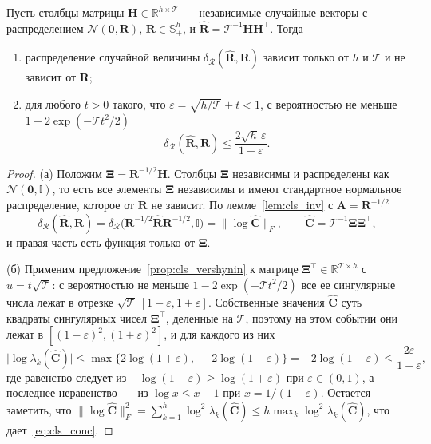 \begin{theorem}\label{thm:cls_conc}
Пусть столбцы матрицы $\mathbf{H} \in \mathbb{R}^{h \times \mathcal{T}}$~--- независимые случайные векторы с распределением $\mathcal{N}(\mathbf{0}, \mathbf{R})$, $\mathbf{R} \in \mathbb{S}_{+}^{h}$, и $\hat{\mathbf{R}} = \mathcal{T}^{-1} \mathbf{H}\mathbf{H}^{\top}$. Тогда
\begin{enumerate}
    \item[(а)] распределение случайной величины $\delta_{\mathcal{R}}(\hat{\mathbf{R}}, \mathbf{R})$ зависит только от $h$ и $\mathcal{T}$ и не зависит от $\mathbf{R}$;
    \item[(б)] для любого $t > 0$ такого, что $\varepsilon = \sqrt{h/\mathcal{T}} + t < 1$, с вероятностью не меньше $1 - 2\exp(-\mathcal{T}t^2/2)$
    \begin{equation}\label{eq:cls_conc}
    \delta_{\mathcal{R}}(\hat{\mathbf{R}}, \mathbf{R}) \leqslant \frac{2\sqrt{h}\, \varepsilon}{1 - \varepsilon} .
    \end{equation}
\end{enumerate}
\end{theorem}
\begin{proof}
(а) Положим $\boldsymbol{\Xi} = \mathbf{R}^{-1/2}\mathbf{H}$. Столбцы $\boldsymbol{\Xi}$ независимы и распределены как $\mathcal{N}(\mathbf{0}, \mathbb{I})$, то есть все элементы $\boldsymbol{\Xi}$ независимы и имеют стандартное нормальное распределение, которое от $\mathbf{R}$ не зависит. По лемме~\ref{lem:cls_inv} с $\mathbf{A} = \mathbf{R}^{-1/2}$
\begin{equation*}
\delta_{\mathcal{R}}(\hat{\mathbf{R}}, \mathbf{R}) = \delta_{\mathcal{R}}\big( \mathbf{R}^{-1/2}\hat{\mathbf{R}}\mathbf{R}^{-1/2}, \mathbb{I} \big) = \big\| \log \hat{\mathbf{C}} \big\|_F ,
\qquad
\hat{\mathbf{C}} = \mathcal{T}^{-1} \boldsymbol{\Xi}\boldsymbol{\Xi}^{\top},
\end{equation*}
и правая часть есть функция только от $\boldsymbol{\Xi}$.

(б) Применим предложение~\ref{prop:cls_vershynin} к матрице $\boldsymbol{\Xi}^{\top} \in \mathbb{R}^{\mathcal{T} \times h}$ с $u = t\sqrt{\mathcal{T}}$: с вероятностью не меньше $1 - 2\exp(-\mathcal{T}t^2/2)$ все ее сингулярные числа лежат в отрезке $\sqrt{\mathcal{T}}\,[1 - \varepsilon, 1 + \varepsilon]$. Собственные значения $\hat{\mathbf{C}}$ суть квадраты сингулярных чисел $\boldsymbol{\Xi}^{\top}$, деленные на $\mathcal{T}$, поэтому на этом событии они лежат в $[(1-\varepsilon)^2, (1+\varepsilon)^2]$, и для каждого из них
\begin{equation*}
\big| \log \lambda_k(\hat{\mathbf{C}}) \big| \leqslant \max\big\{ 2\log(1+\varepsilon),\ -2\log(1-\varepsilon) \big\} = -2\log(1-\varepsilon) \leqslant \frac{2\varepsilon}{1-\varepsilon} ,
\end{equation*}
где равенство следует из $-\log(1-\varepsilon) \geqslant \log(1+\varepsilon)$ при $\varepsilon \in (0,1)$, а последнее неравенство~--- из $\log x \leqslant x - 1$ при $x = 1/(1-\varepsilon)$. Остается заметить, что $\|\log\hat{\mathbf{C}}\|_F^2 = \sum_{k=1}^{h} \log^2 \lambda_k(\hat{\mathbf{C}}) \leqslant h \max_k \log^2 \lambda_k(\hat{\mathbf{C}})$, что дает~\eqref{eq:cls_conc}.
\end{proof}

